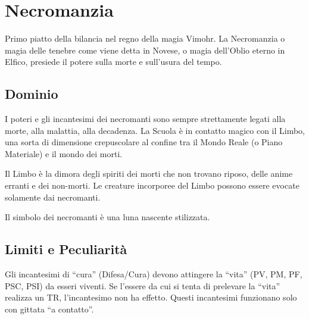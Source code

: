 \vfill\section{Necromanzia} 



Primo piatto della bilancia nel regno della
magia Vimohr. La Necromanzia o magia delle tenebre come viene detta in Novese,
o magia dell'Oblio eterno in Elfico, presiede il potere sulla morte e sull'usura
del tempo.

\subsection{Dominio}

I poteri e gli incantesimi dei necromanti sono sempre strettamente
legati alla morte, alla malattia, alla decadenza. La Scuola \`e in
contatto magico con il Limbo, una sorta di dimensione crepuscolare al
confine tra il Mondo Reale (o Piano Materiale) e il mondo dei morti.

Il Limbo \`e la dimora degli spiriti dei morti che non trovano
riposo, delle anime erranti e dei non-morti. Le creature incorporee
del Limbo possono essere evocate solamente dai necromanti.

Il simbolo dei necromanti \`e una luna nascente stilizzata.

\subsection{Limiti e Peculiarit\`a}  

Gli incantesimi di ``cura'' (Difesa/Cura) devono attingere la ``vita''
(PV, PM, PF, PSC, PSI) da esseri viventi. Se l'essere da cui si tenta
di prelevare la ``vita'' realizza un TR, l'incantesimo non ha effetto.
Questi incantesimi funzionano solo con gittata ``a contatto''.


